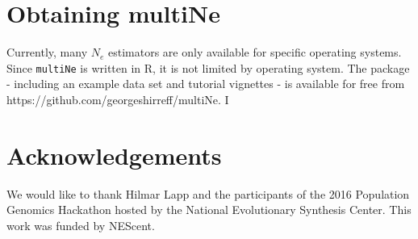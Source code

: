 \documentclass[english,titlepage]{article}
\begin{document}
\section*{Obtaining multiNe}
Currently, many $N_e$ estimators are only available for specific operating systems. Since \texttt{multiNe} is written in R, it is not limited by operating system. The package - including an example data set and tutorial vignettes - is available for free from https://github.com/georgeshirreff/multiNe. I

\section*{Acknowledgements}
We would like to thank Hilmar Lapp and the participants of the 2016 Population Genomics Hackathon hosted by the National Evolutionary Synthesis Center. This work was funded by NEScent. 





\end{document}
